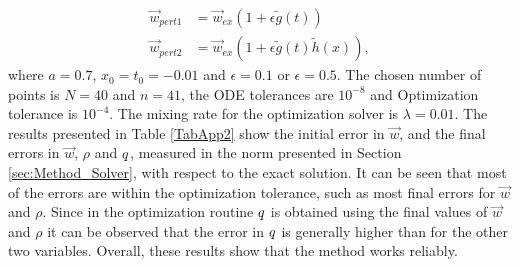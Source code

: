 \begin{align*}
\vec{w}_{pert1} &= \vec{w}_{ex}(1+ \epsilon \tilde g(t))\\
\vec{w}_{pert2} &= \vec{w}_{ex}(1+ \epsilon \tilde g(t) \tilde h(x)),
\end{align*}
where $a = 0.7$, $x_0 = t_0 = -0.01$ and $\epsilon = 0.1$ or $\epsilon = 0.5$.
The chosen number of points is $N =40$ and $n=41$, the ODE tolerances are $10^{-8}$ and Optimization tolerance is $10^{-4}$. The mixing rate for the optimization solver is $\lambda = 0.01$.
The results presented in Table \ref{TabApp2} show the initial error in $\vec{w}$, and the final errors in $\vec{w}$, $\rho$ and $q$, measured in the norm presented in Section \ref{sec:Method_Solver}, with respect to the exact solution. It can be seen that most of the errors are within the optimization tolerance, such as most final errors for $\vec{w}$ and $\rho$. Since in the optimization routine $q$ is obtained using the final values of $\vec{w}$ and $\rho$ it can be observed that the error in $q$ is generally higher than for the other two variables. Overall, these results show that the method works reliably.

